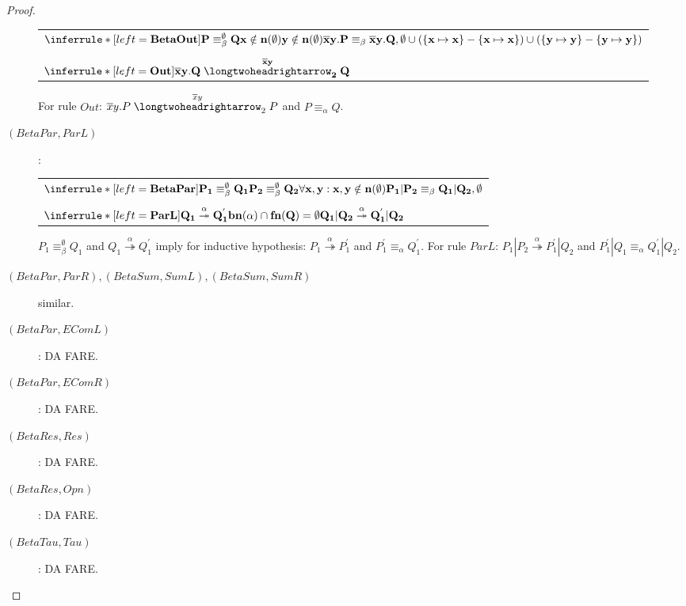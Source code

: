 \begin{lemma}
\begin{proof}
\begin{description}
\begin{center}
	  \begin{tabular}{l}
	      $\inferrule*[left=\bf{BetaOut}]{
		  P\equiv_{\beta}^{\emptyset}Q
		\\
		  x\notin n(\emptyset)
		\\
		  y\notin n(\emptyset)
	      }{
		  \overline{x}y.P\equiv_{\beta}\overline{x}y.Q,
		\\
		  \emptyset \cup (\{x\mapsto x\}-\{x\mapsto x\}) \cup (\{y\mapsto y\}-\{y\mapsto y\})
	      }$
	    \\\\
	      $\inferrule*[left=\bf{Out}]{
	      }{
		  \overline{x}y.Q \stackrel{\overline{x}y}{\longtwoheadrightarrow}_{2} Q
	      }$	      
	  \\
	  \end{tabular}
	\end{center}
	For rule $Out$: $\overline{x}y.P \stackrel{\overline{x}y}{\longtwoheadrightarrow}_{2} P$ and $P\equiv_{\alpha}Q$.
      \item[$(BetaPar, ParL)$]:
	\begin{center}
	  \begin{tabular}{l}
	      $\inferrule*[left=\bf{BetaPar}]{
		  P_{1}\equiv_{\beta}^{\emptyset}Q_{1}
		\\
		  P_{2}\equiv_{\beta}^{\emptyset}Q_{2}
		\\
		  \forall x,y: x,y\notin n(\emptyset)
	      }{
		  P_{1}|P_{2}\equiv_{\beta}Q_{1}|Q_{2},
		\\
		  \emptyset
	      }$
	    \\\\
	      $\inferrule* [left=\bf{ParL}]{
		  Q_{1} \stackrel{\alpha}{\twoheadrightarrow} Q_{1}^{'}
		\\
		  bn(\alpha)\cap fn(Q)=\emptyset
	      }{
		Q_{1}|Q_{2} \stackrel{\alpha}{\twoheadrightarrow} Q_{1}^{'}|Q_{2}
	      }$
	  \end{tabular}
	\end{center}
	$P_{1}\equiv_{\beta}^{\emptyset}Q_{1}$ and $Q_{1} \stackrel{\alpha}{\twoheadrightarrow} Q_{1}^{'}$ imply for inductive hypothesis: $P_{1} \stackrel{\alpha}{\twoheadrightarrow} P_{1}^{'}$ and $P_{1}^{'} \equiv_{\alpha} Q_{1}^{'}$. For rule $ParL$: $P_{1}|P_{2} \stackrel{\alpha}{\twoheadrightarrow} P_{1}^{'}|Q_{2}$ and $P_{1}^{'}|Q_{1} \equiv_{\alpha} Q_{1}^{'}|Q_{2}$.
      \item[$(BetaPar, ParR),(BetaSum, SumL),(BetaSum, SumR)$] similar.
      \item[$(BetaPar, EComL)$]: DA FARE.
      \item[$(BetaPar, EComR)$]: DA FARE.
      \item[$(BetaRes, Res)$]: DA FARE.
      \item[$(BetaRes, Opn)$]: DA FARE.
      \item[$(BetaTau, Tau)$]: DA FARE.
    \end{description}
  \end{proof}
\end{lemma}


